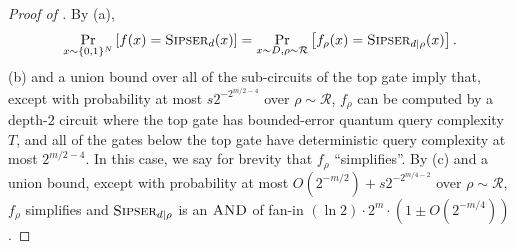 \documentclass[11pt]{article}%
\newcommand{\Sipser}{\normalfont\textsc{Sipser}}
\newcommand{\AND}{\normalfont\textsc{AND}} %
\begin{document}
\begin{proof}[Proof of ]
By (a),
\[
\Pr_{x \sim \{0,1\}^N}\left[f(x) = \Sipser_d(x)\right]
= \Pr_{x \sim D, \rho \sim \mathcal{R}}\left[f_\rho(x) = \Sipser_{d|\rho} (x)\right].
\]
(b) and a union bound over all of the sub-circuits of the top gate imply that, except with probability at most $s2^{-2^{m/2 - 4}}$ over $\rho \sim \mathcal{R}$, $f_\rho$ can be computed by a depth-$2$ circuit where the top gate has bounded-error quantum query complexity $T$, and all of the gates below the top gate have deterministic query complexity at most $2^{m/2-4}$. In this case, we say for brevity that $f_\rho$ ``simplifies''. By (c) and a union bound, except with probability at most $O\left(2^{-m/2}\right) + s2^{-2^{m/4 - 2}}$ over $\rho \sim \mathcal{R}$, $f_\rho$ simplifies and $\Sipser_{d|\rho}$ is an $\AND$ of fan-in $(\ln 2) \cdot 2^m \cdot \left(1 \pm O\left(2^{-m/4}\right)\right)$.


\end{proof}
\end{document}
